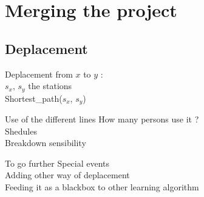 \section{Merging the project}

\subsection{Deplacement}

\begin{frame}{}
Deplacement from $x$ to $y$ :\\
$s_x$, $s_y$ the stations\\
Shortest\_path($s_x$, $s_y$)

\begin{alertblock}{Use of the different lines}
How many persons use it ?\\
Shedules\\
Breakdown sensibility
\end{alertblock}
\end{frame}

\begin{frame}{To go further}
Special events\\
Adding other way of deplacement\\
Feeding it as a blackbox to other learning algorithm 

\end{frame}
